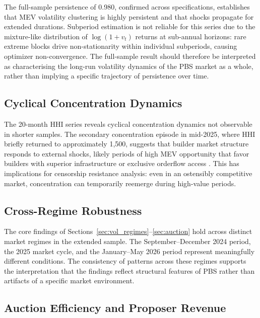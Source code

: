 \documentclass[11pt]{article}
\begin{document}
The full-sample persistence of 0.980, confirmed across specifications,
establishes that MEV volatility clustering is highly persistent and that shocks
propagate for extended durations. Subperiod estimation is not reliable for this
series due to the mixture-like distribution of $\log(1+v_t)$ returns at
sub-annual horizons: rare extreme blocks drive non-stationarity within
individual subperiods, causing optimizer non-convergence. The full-sample
result should therefore be interpreted as characterising the long-run
volatility dynamics of the PBS market as a whole, rather than implying
a specific trajectory of persistence over time.

\subsection{Cyclical Concentration Dynamics}
\label{sec:disc_concentration}

The 20-month HHI series reveals cyclical concentration dynamics not observable
in shorter samples. The secondary concentration episode in mid-2025, where HHI
briefly returned to approximately 1,500, suggests that builder market structure
responds to external shocks, likely periods of high MEV opportunity that favor
builders with superior infrastructure or exclusive orderflow access
\citep{wu2025}. This has implications for censorship resistance analysis: even
in an ostensibly competitive market, concentration can temporarily reemerge
during high-value periods.

\subsection{Cross-Regime Robustness}
\label{sec:disc_robustness}

The core findings of Sections~\ref{sec:vol_regimes}--\ref{sec:auction} hold
across distinct market regimes in the extended sample. The September--December 2024 period, the 2025 market cycle, and the
January--May 2026 period represent meaningfully different conditions. The
consistency of patterns across these regimes supports the interpretation that
the findings reflect structural features of PBS rather than artifacts of a
specific market environment.

\subsection{Auction Efficiency and Proposer Revenue}
\label{sec:disc_efficiency}
\end{document}
